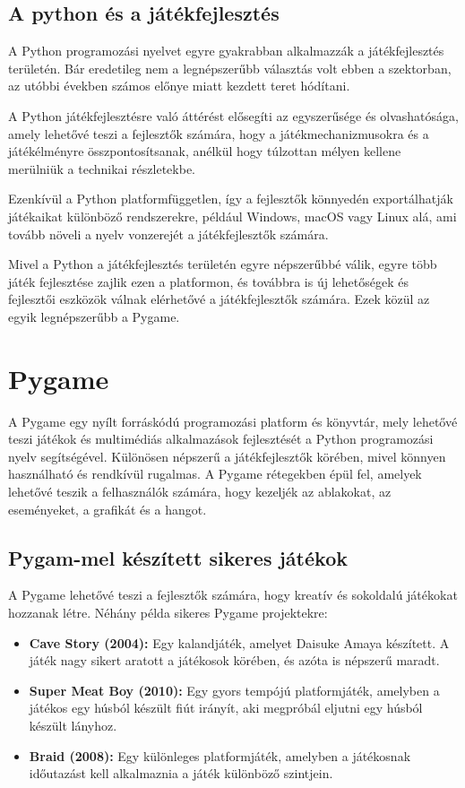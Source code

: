 \subsection{A python és a játékfejlesztés}
 A Python programozási nyelvet egyre gyakrabban alkalmazzák a játékfejlesztés területén.\cite{python-in-game-dev} Bár eredetileg nem a legnépszerűbb választás volt ebben a szektorban, az utóbbi években számos előnye miatt kezdett teret hódítani.

A Python játékfejlesztésre való áttérést elősegíti az egyszerűsége és olvashatósága, amely lehetővé teszi a fejlesztők számára, hogy a játékmechanizmusokra és a játékélményre összpontosítsanak, anélkül hogy túlzottan mélyen kellene merülniük a technikai részletekbe.

Ezenkívül a Python platformfüggetlen, így a fejlesztők könnyedén exportálhatják játékaikat különböző rendszerekre, például Windows, macOS vagy Linux alá, ami tovább növeli a nyelv vonzerejét a játékfejlesztők számára.

Mivel a Python a játékfejlesztés területén egyre népszerűbbé válik, egyre több játék fejlesztése zajlik ezen a platformon, és továbbra is új lehetőségek és fejlesztői eszközök válnak elérhetővé a játékfejlesztők számára. Ezek közül az egyik legnépszerűbb a Pygame.

\section{Pygame}
 A Pygame\cite{pygame} egy nyílt forráskódú programozási platform és könyvtár, mely lehetővé teszi játékok és multimédiás alkalmazások fejlesztését a Python programozási nyelv segítségével. Különösen népszerű a játékfejlesztők körében, mivel könnyen használható és rendkívül rugalmas. A Pygame rétegekben épül fel, amelyek lehetővé teszik a felhasználók számára, hogy kezeljék az ablakokat, az eseményeket, a grafikát és a hangot.

\subsection{Pygam-mel készített sikeres játékok}
 A Pygame lehetővé teszi a fejlesztők számára, hogy kreatív és sokoldalú játékokat hozzanak létre. Néhány példa sikeres Pygame projektekre:

\begin{itemize}
    \item \textbf{Cave Story\cite{CaveStory} (2004):} Egy kalandjáték, amelyet Daisuke Amaya készített. A játék nagy sikert aratott a játékosok körében, és azóta is népszerű maradt. 
    \item \textbf{Super Meat Boy\cite{SuperMeatBoy} (2010):} Egy gyors tempójú platformjáték, amelyben a játékos egy húsból készült fiút irányít, aki megpróbál eljutni egy húsból készült lányhoz.
    \item \textbf{Braid\cite{Braid} (2008):} Egy különleges platformjáték, amelyben a játékosnak időutazást kell alkalmaznia a játék különböző szintjein.
\end{itemize}


